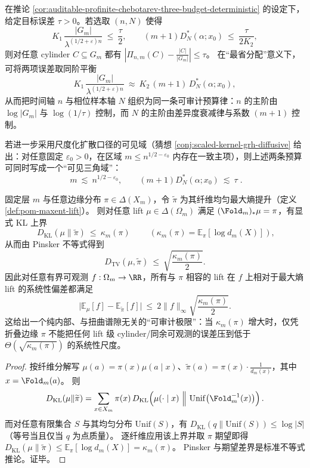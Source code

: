 \begin{corollary}\label{cor:auditable-profinite-chebotarev-balance-triangle}
在推论 \ref{cor:auditable-profinite-chebotarev-three-budget-deterministic} 的设定下，给定目标误差 \(\tau>0\)。若选取 \((n,N)\) 使得
\[
K_1\,\frac{|G_m|}{\lambda^{(1/2+\varepsilon)n}}\ \le\ \frac{\tau}{2},
\qquad
(m+1)D_N^*(\alpha;x_0)\ \le\ \frac{\tau}{2K_2},
\]
则对任意 cylinder \(C\subseteq G_m\) 都有
\(
\left|\Pi_{n,m}(C)-\frac{|C|}{|G_m|}\right|\le \tau
\)。
在“最省分配”意义下，可将两项误差取同阶平衡
\[
K_1\,\frac{|G_m|}{\lambda^{(1/2+\varepsilon)n}}
\ \approx\
K_2\,(m+1)\,D_N^*(\alpha;x_0),
\]
从而把时间轴 \(n\) 与相位样本轴 \(N\) 组织为同一条可审计预算律：\(n\) 的主阶由 \(\log|G_m|\) 与 \(\log(1/\tau)\) 控制，而 \(N\) 的主阶由差异度衰减律与系数 \((m+1)\) 控制。
\par
若进一步采用尺度化扩散口径的可见域（猜想 \ref{conj:scaled-kernel-grh-diffusive} 给出：对任意固定 \(\varepsilon_0>0\)，在区域 \(m\le n^{1/2-\varepsilon_0}\) 内存在一致主项），则上述两条预算可同时写成一个“可见三角域”：
\[
\boxed{\;
m\ \lesssim\ n^{1/2-\varepsilon_0},
\qquad
(m+1)D_N^*(\alpha;x_0)\ \lesssim\ \tau\; }.
\]
\end{corollary}

\begin{theorem}\label{thm:defect-limited-audit}
固定层 \(m\) 与任意边缘分布 \(\pi\in\Delta(X_m)\)，令 \(\widetilde\pi\) 为其纤维均匀最大熵提升（定义 \ref{def:pom-maxent-lift}）。
则对任意 lift \(\mu\in\Delta(\Omega_m)\) 满足 \((\Fold_m)_*\mu=\pi\)，有显式 KL 上界
\[
\boxed{\;
D_{\mathrm{KL}}(\mu\|\widetilde\pi)\ \le\ \kappa_m(\pi)
\;}
\qquad(\kappa_m(\pi)=\mathbb{E}_\pi[\log d_m(X)]),
\]
从而由 Pinsker 不等式得到
\[
\boxed{\;
D_{\mathrm{TV}}(\mu,\widetilde\pi)\ \le\ \sqrt{\frac{\kappa_m(\pi)}{2}}.
\;}
\]
因此对任意有界可观测 \(f:\Omega_m\to\RR\)，所有与 \(\pi\) 相容的 lift 在 \(f\) 上相对于最大熵 lift 的系统性偏差都满足
\[
\boxed{\;
\bigl|\mathbb{E}_\mu[f]-\mathbb{E}_{\widetilde\pi}[f]\bigr|
\ \le\ 2\|f\|_\infty\sqrt{\frac{\kappa_m(\pi)}{2}}.
\;}
\]
这给出一个纯内部、与扭曲谱隙无关的“可审计极限”：当 \(\kappa_m(\pi)\) 增大时，仅凭折叠边缘 \(\pi\) 不能把任何 lift 级 cylinder/同余可观测的误差压到低于 \(\Theta(\sqrt{\kappa_m(\pi)})\) 的系统性尺度。
\end{theorem}

\begin{proof}
按纤维分解写 \(\mu(a)=\pi(x)\mu(a\mid x)\)、\(\widetilde\pi(a)=\pi(x)\cdot \frac{1}{d_m(x)}\)，其中 \(x=\Fold_m(a)\)。
则
\[
D_{\mathrm{KL}}(\mu\|\widetilde\pi)
=\sum_{x\in X_m}\pi(x)\,D_{\mathrm{KL}}\!\left(\mu(\cdot\mid x)\ \Big\|\ \mathrm{Unif}\big(\Fold_m^{-1}(x)\big)\right).
\]
而对任意有限集合 \(S\) 与其均匀分布 \(\mathrm{Unif}(S)\)，有 \(D_{\mathrm{KL}}(q\|\mathrm{Unif}(S))\le \log|S|\)（等号当且仅当 \(q\) 为点质量）。
逐纤维应用该上界并取 \(\pi\) 期望即得 \(D_{\mathrm{KL}}(\mu\|\widetilde\pi)\le \mathbb{E}_\pi[\log d_m(X)]=\kappa_m(\pi)\)。
Pinsker 与期望差界是标准不等式推论。证毕。
\end{proof}
